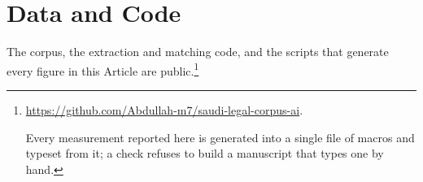 \documentclass[12pt]{article}
\newif\ifanon
\begin{document}
\section*{Data and Code}

\noindent
The corpus, the extraction and matching code, and the scripts that generate
every figure in this Article are public.\footnote{\label{fn:data}%
\ifanon
Repository withheld for anonymous review; it names the author. It will be
cited in full in the published version.
\else
\url{https://github.com/Abdullah-m7/saudi-legal-corpus-ai}.
\fi
Every measurement reported here is generated into a single file of macros and
typeset from it; a check refuses to build a manuscript that types one by
hand.}
\end{document}
